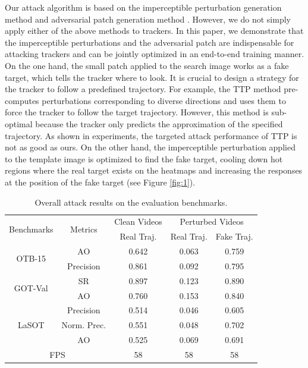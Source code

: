 \documentclass[journal]{IEEEtran}
\begin{document}
Our attack algorithm is based on the imperceptible perturbation generation method \cite{FGSM} and adversarial patch generation method \cite{patch}. However, we do not simply apply either of the above methods to trackers. In this paper, we demonstrate that the imperceptible perturbations and the adversarial patch are indispensable for attacking trackers and can be jointly optimized in an end-to-end training manner. On the one hand, the small patch applied to the search image works as a fake target, which tells the tracker where to look. It is crucial to design a strategy for the tracker to follow a predefined trajectory. For example, the TTP method \cite{TTP} pre-computes perturbations corresponding to diverse directions and uses them to force the tracker to follow the target trajectory. However, this method is sub-optimal because the tracker only predicts the approximation of the specified trajectory. As shown in experiments, the targeted attack performance of TTP is not as good as ours. On the other hand, the imperceptible perturbation applied to the template image is optimized to find the fake target, cooling down hot regions where the real target exists on the heatmaps and increasing the responses at the position of the fake target (see Figure \ref{fig:1}).

\begin{table}
  \centering
  \caption{Overall attack results on the evaluation benchmarks.}
  \begin{tabular}{c c | c | c | c}
  \toprule
  \multirow{2}{*}[-2pt]{Benchmarks} & \multirow{2}{*}[-2pt]{Metrics} & Clean Videos    & \multicolumn{2}{c}{Perturbed Videos}  \\
  \cmidrule{3-5}
                            &                         & Real Traj. & Real Traj. & Fake Traj.     \\ 
  \midrule
  \multirow{2}{*}{OTB-15} 
  & AO   & 0.642 & 0.063 & 0.759\\
  & Precision & 0.861 & 0.092 & 0.795\\
  \midrule
  \multirow{2}{*}{GOT-Val} 
  & SR & 0.897 & 0.123 & 0.890\\
  & AO & 0.760 & 0.153 & 0.840 \\
  \midrule
  \multirow{3}{*}{LaSOT} 
  & Precision  & 0.514 & 0.046 & 0.605\\
  & Norm. Prec.& 0.551 & 0.048 & 0.702\\
  & AO         & 0.525 & 0.069 & 0.691\\
  \midrule
  \multicolumn{2}{c|}{FPS} & 58 & 58 & 58\\
  \bottomrule
  \end{tabular}
  \label{tab:benchmark results}
  \end{table}
\end{document}
